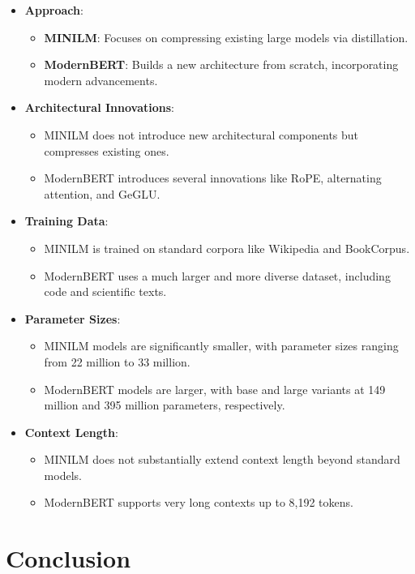 \documentclass{article}
\begin{document}
\begin{itemize}  
    \item \textbf{Approach}:  
    \begin{itemize}  
        \item \textbf{MINILM}: Focuses on compressing existing large models via distillation.  
        \item \textbf{ModernBERT}: Builds a new architecture from scratch, incorporating modern advancements.  
    \end{itemize}  
    \item \textbf{Architectural Innovations}:  
    \begin{itemize}  
        \item MINILM does not introduce new architectural components but compresses existing ones.  
        \item ModernBERT introduces several innovations like RoPE, alternating attention, and GeGLU.  
    \end{itemize}  
    \item \textbf{Training Data}:  
    \begin{itemize}  
        \item MINILM is trained on standard corpora like Wikipedia and BookCorpus.  
        \item ModernBERT uses a much larger and more diverse dataset, including code and scientific texts.  
    \end{itemize}  
    \item \textbf{Parameter Sizes}:  
    \begin{itemize}  
        \item MINILM models are significantly smaller, with parameter sizes ranging from 22 million to 33 million.  
        \item ModernBERT models are larger, with base and large variants at 149 million and 395 million parameters, respectively.  
    \end{itemize}  
    \item \textbf{Context Length}:  
    \begin{itemize}  
        \item MINILM does not substantially extend context length beyond standard models.  
        \item ModernBERT supports very long contexts up to 8,192 tokens.  
    \end{itemize}  
\end{itemize}  
  
\section{Conclusion}  
  
\end{document}
